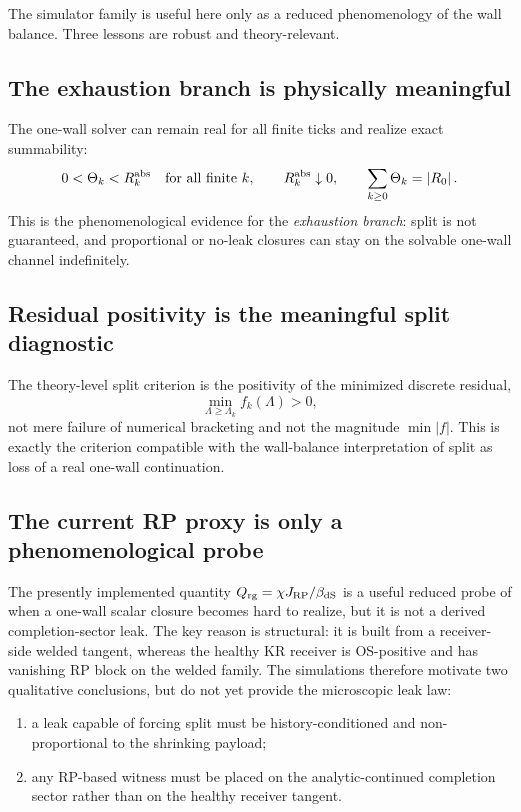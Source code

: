 \documentclass[11pt]{article}
\theoremstyle{definition}
\theoremstyle{plain}
\theoremstyle{remark}
\newcommand{\abs}[1]{\left\lvert #1\right\rvert}
\begin{document}
The simulator family is useful here only as a reduced phenomenology of the wall balance. Three lessons are robust and
theory-relevant.

\subsection{The exhaustion branch is physically meaningful}

The one-wall solver can remain real for all finite ticks and realize exact summability:
\[
0<\Theta_k<R_k^{\rm abs}\quad\text{for all finite }k,\qquad
R_k^{\rm abs}\downarrow 0,\qquad
\sum_{k\ge 0}\Theta_k=\abs{R_0}.
\]
This is the phenomenological evidence for the \emph{exhaustion branch}: split is not guaranteed, and proportional
or no-leak closures can stay on the solvable one-wall channel indefinitely.

\subsection{Residual positivity is the meaningful split diagnostic}

The theory-level split criterion is the positivity of the minimized discrete residual,
\[
\min_{\Lambda\ge \Lambda_k} f_k(\Lambda)>0,
\]
not mere failure of numerical bracketing and not the magnitude \(\min |f|\).
This is exactly the criterion compatible with the wall-balance interpretation of split as loss of a real one-wall
continuation.

\subsection{The current RP proxy is only a phenomenological probe}

The presently implemented quantity \(Q_{\rm rg}=\chi J_{\rm RP}/\beta_{\rm dS}\) is a useful reduced probe of when a
one-wall scalar closure becomes hard to realize, but it is not a derived completion-sector leak.
The key reason is structural: it is built from a receiver-side welded tangent, whereas the healthy KR receiver is
OS-positive and has vanishing RP block on the welded family.
The simulations therefore motivate two qualitative conclusions, but do not yet provide the microscopic leak law:
\begin{enumerate}[leftmargin=2em]
\item a leak capable of forcing split must be history-conditioned and non-proportional to the shrinking payload;
\item any RP-based witness must be placed on the analytic-continued completion sector rather than on the healthy
receiver tangent.
\end{enumerate}
\end{document}
